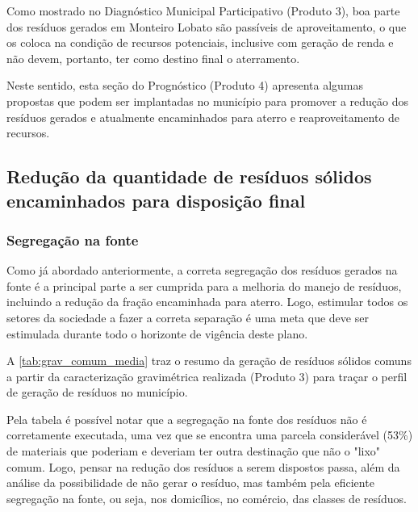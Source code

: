 
Como mostrado no Diagnóstico Municipal Participativo (Produto 3), boa parte dos resíduos gerados em Monteiro Lobato são passíveis de aproveitamento, o que os coloca na condição de recursos potenciais, inclusive com geração de renda e não devem, portanto, ter como destino final o aterramento. 

Neste sentido, esta seção do Prognóstico (Produto 4) apresenta algumas propostas que podem ser implantadas no município para promover a redução dos resíduos gerados e atualmente encaminhados para aterro e reaproveitamento de recursos.


\subsection{Redução da quantidade de resíduos sólidos encaminhados para disposição final}

\subsubsection{Segregação na fonte}

Como já abordado anteriormente, a correta segregação dos resíduos gerados na fonte é a principal parte a ser cumprida para a melhoria do manejo de resíduos, incluindo a redução da fração encaminhada para aterro. Logo, estimular todos os setores da sociedade a fazer a correta separação é uma meta que deve ser estimulada durante todo o horizonte de vigência deste plano. 
 
A \autoref{tab:grav_comum_media} traz o resumo da geração de resíduos sólidos comuns a partir da caracterização gravimétrica realizada (Produto 3) para traçar o perfil de geração de resíduos no município. 




Pela tabela é possível notar que a segregação na fonte dos resíduos não é corretamente executada, uma vez que se encontra uma parcela considerável (53\%) de materiais que poderiam e deveriam ter outra destinação que não o "lixo" comum. Logo, pensar na redução dos resíduos a serem dispostos passa, além da análise da possibilidade de não gerar o resíduo, mas também pela eficiente segregação na fonte, ou seja, nos domicílios, no comércio, das classes de resíduos. 

